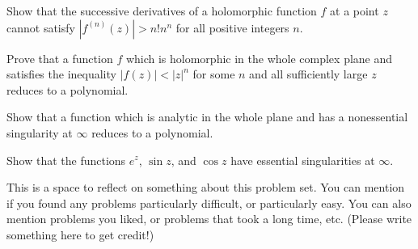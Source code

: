 \begin{problem}
  Show that the successive derivatives of a holomorphic function $f$ at a point $z$ cannot satisfy $|f^{(n)}(z)|>n!n^n$ for all positive integers $n$.
\end{problem}

\begin{problem}
  Prove that a function $f$ which is holomorphic in the whole complex plane and satisfies the inequality $|f(z)|<|z|^n$ for some $n$ and all sufficiently large $z$ reduces to a polynomial.
\end{problem}

\begin{problem}
  Show that a function which is analytic in the whole plane and has a nonessential singularity at $\infty$ reduces to a polynomial.
\end{problem}

\begin{problem}
  Show that the functions $e^z$, $\sin z$, and $\cos z$ have essential singularities at $\infty$.
\end{problem}

\begin{problem}
  This is a space to reflect on something about this problem set. You can mention if you found any problems particularly difficult, or particularly easy. You can also mention problems you liked, or problems that took a long time, etc. (Please write something here to get credit!)
\end{problem}
